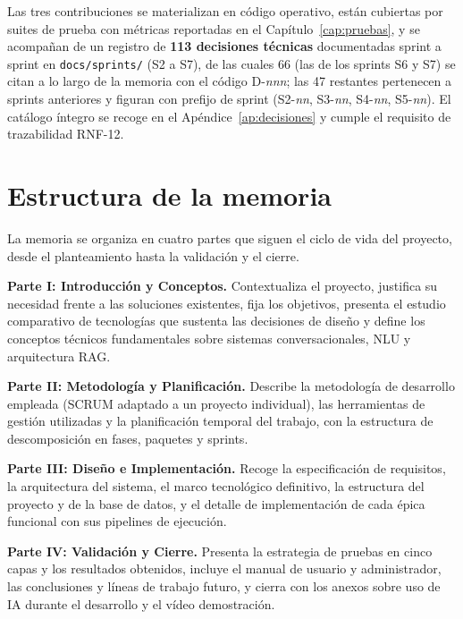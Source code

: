 Las tres contribuciones se materializan en código operativo, están cubiertas por suites de prueba con métricas reportadas en el Capítulo~\ref{cap:pruebas}, y se acompañan de un registro de \textbf{113 decisiones técnicas} documentadas sprint a sprint en \texttt{docs/sprints/} (S2 a S7), de las cuales 66 (las de los sprints S6 y S7) se citan a lo largo de la memoria con el código D-\textit{nnn}; las 47 restantes pertenecen a sprints anteriores y figuran con prefijo de sprint (S2-\textit{nn}, S3-\textit{nn}, S4-\textit{nn}, S5-\textit{nn}). El catálogo íntegro se recoge en el Apéndice~\ref{ap:decisiones} y cumple el requisito de trazabilidad RNF-12.

\section{Estructura de la memoria}
\label{sec:estructura-memoria}

La memoria se organiza en cuatro partes que siguen el ciclo de vida del proyecto, desde el planteamiento hasta la validación y el cierre.

\textbf{Parte I: Introducción y Conceptos.} Contextualiza el proyecto, justifica su necesidad frente a las soluciones existentes, fija los objetivos, presenta el estudio comparativo de tecnologías que sustenta las decisiones de diseño y define los conceptos técnicos fundamentales sobre sistemas conversacionales, NLU y arquitectura RAG.

\textbf{Parte II: Metodología y Planificación.} Describe la metodología de desarrollo empleada (SCRUM adaptado a un proyecto individual), las herramientas de gestión utilizadas y la planificación temporal del trabajo, con la estructura de descomposición en fases, paquetes y sprints.

\textbf{Parte III: Diseño e Implementación.} Recoge la especificación de requisitos, la arquitectura del sistema, el marco tecnológico definitivo, la estructura del proyecto y de la base de datos, y el detalle de implementación de cada épica funcional con sus pipelines de ejecución.

\textbf{Parte IV: Validación y Cierre.} Presenta la estrategia de pruebas en cinco capas y los resultados obtenidos, incluye el manual de usuario y administrador, las conclusiones y líneas de trabajo futuro, y cierra con los anexos sobre uso de IA durante el desarrollo y el vídeo demostración.
